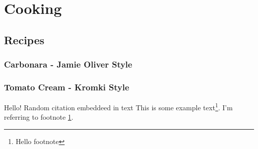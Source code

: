 \documentclass{article}
\begin{document}
\section{Cooking}


\subsection{Recipes}
\subsubsection{Carbonara - Jamie Oliver Style}

\subsubsection{Tomato Cream - Kromki Style}


Hello!
Random citation \cite{DUMMY:1} embeddeed in text
This is some example text\footnote{\label{myfootnote}Hello footnote}.
I'm referring to footnote \ref{myfootnote}.

\begin{appendix}
  \listoffigures
  \listoftables
\end{appendix}



\end{document}
